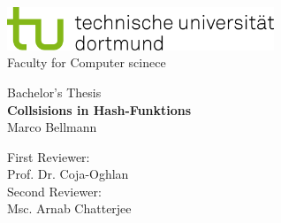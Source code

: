 \begin{titlepage}
    \vspace*{-2cm}
    \newlength{\links}
    \setlength{\links}{-1.5cm}
    \sffamily
    \hspace*{\links}
    \begin{minipage}{12.5cm}
        \includegraphics[width=8cm]{bilder/tud_logo_rgb}\\
        Faculty for Computer scinece 

    \end{minipage}

    \vspace*{4cm}

    \hspace*{\links}
    \hspace*{-0.2cm}
        \large
        \begin{center}
            {\Large Bachelor's Thesis} \\
            \vspace*{0.5cm}
            {\LARGE
            \textbf{Collsisions in Hash-Funktions} \\
            }
            \vspace*{0.5cm}
            Marco Bellmann\\
        \end{center}
    \normalsize
    \vspace*{4.5cm}



    \hspace*{\links}
        \center
        First Reviewer: \\
        Prof. Dr. Coja-Oghlan \\
        \vspace*{0.5cm}
        Second Reviewer: \\
        Msc. Arnab Chatterjee \\


\end{titlepage}
